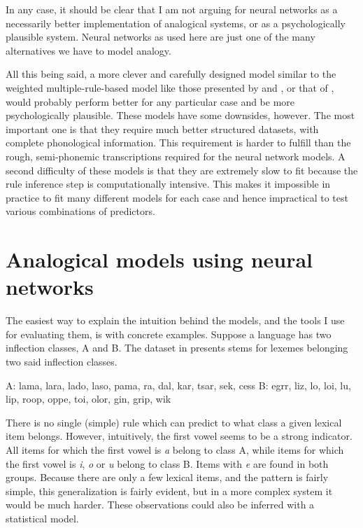 In any case, it should be clear that I am not arguing for neural networks as a necessarily better implementation of analogical systems, or as a psychologically plausible system. Neural networks as used here are just one of the many alternatives we have to model analogy.

All this being said, a more clever and carefully designed model similar to the weighted multiple-rule-based model like those presented by \textcite{Albright.2003} and \textcite{Albright.2009}, or that of \textcite{Beniamine.2016}, would probably perform better for any particular case and be more psychologically plausible. These models have some downsides, however. The most important one is that they require much better structured datasets, with complete phonological information. This requirement is harder to fulfill than the rough, semi-phonemic transcriptions required for the neural network models. A second difficulty of these models is that they are extremely slow to fit because the rule inference step is computationally intensive. This makes it impossible in practice to fit many different models for each case and hence impractical to test various combinations of predictors.

\section{Analogical models using neural networks}

The easiest way to explain the intuition behind the models, and the tools I use for evaluating them, is with concrete examples. Suppose a language has two inflection classes, A and B. The dataset in  presents stems for lexemes belonging two said inflection classes.

\begin{exe}
    \ex  \label{exe-inflect-1}
    \begin{xlist}
        \ex A: lama, lara, lado, laso, pama, ra, dal, kar, tsar, sek, cess
        \ex B: egrr, liz, lo, loi, lu, lip, roop, oppe, toi, olor, gin, grip, wik
    \end{xlist}
\end{exe}

There is no single (simple) rule which can predict to what class a given lexical item belongs. However, intuitively, the first vowel seems to be a strong indicator. All items for which the first vowel is \textit{a} belong to class A, while items for which the first vowel is \textit{i}, \textit{o} or \textit{u} belong to class B. Items with \textit{e} are found in both groups. Because there are only a few lexical items, and the pattern is fairly simple, this generalization is fairly evident, but in a more complex system it would be much harder. These observations could also be inferred with a statistical model.

